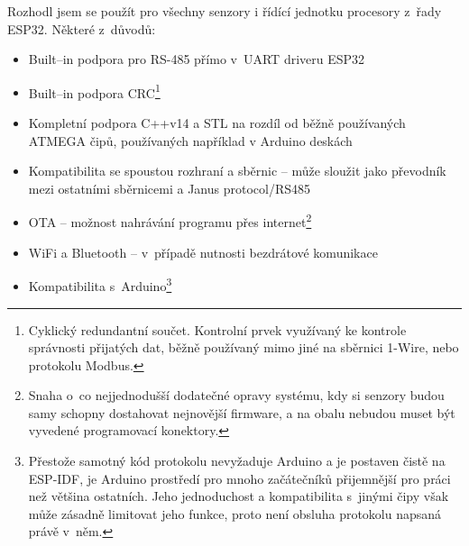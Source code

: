 Rozhodl jsem se použít pro všechny senzory i řídící jednotku procesory z~řady ESP32.
Některé z~důvodů:
\begin{itemize}
    \item Built--in podpora pro RS-485 přímo v~UART driveru ESP32
    \item Built--in podpora CRC\footnote{Cyklický redundantní součet. Kontrolní prvek využívaný ke kontrole správnosti přijatých dat, běžně používaný mimo jiné na sběrnici 1-Wire, nebo protokolu Modbus.}
    \item Kompletní podpora C++v14 a STL na rozdíl od běžně používaných ATMEGA čipů, používaných například v Arduino deskách
    \item Kompatibilita se spoustou rozhraní a sběrnic -- může sloužit jako převodník mezi ostatními sběrnicemi a Janus protocol/RS485
    \item OTA -- možnost nahrávání programu přes internet\footnote{Snaha o~co nejjednodušší dodatečné opravy systému, kdy si senzory budou samy schopny dostahovat nejnovější firmware, a na obalu nebudou muset být vyvedené programovací konektory.}
    \item WiFi a Bluetooth -- v~případě nutnosti bezdrátové komunikace
    \item Kompatibilita s~Arduino\footnote{Přestože samotný kód protokolu nevyžaduje Arduino a je postaven čistě na ESP-IDF, je Arduino prostředí pro mnoho začátečníků přijemnější pro práci než většina ostatních. Jeho jednoduchost a kompatibilita s~jinými čipy však může zásadně limitovat jeho funkce, proto není obsluha protokolu napsaná právě v~něm.}
\end{itemize}